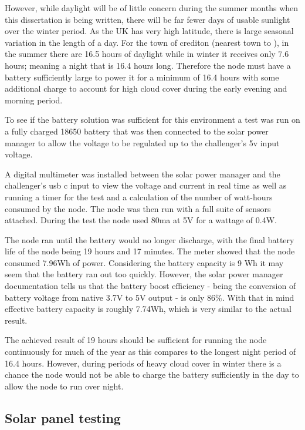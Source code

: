 However, while daylight will be of little concern during the summer months when
this dissertation is being written, there will be far fewer days of usable
sunlight over the winter period. As the UK has very high latitude, there is
large seasonal variation in the length of a day. For the town of crediton
(nearest town to \farmName), in the summer there are 16.5 hours of daylight
while in winter it receives only 7.6 hours; meaning a night that is 16.4 hours
long. Therefore the node must have a battery sufficiently large to power it for
a minimum of 16.4 hours with some additional charge to account for high cloud
cover during the early evening and morning period.

To see if the battery solution was sufficient for this environment a test
was run on a fully charged 18650 battery that was then connected to the solar
power manager to allow the voltage to be regulated up to the challenger's 5v
input voltage.

A digital multimeter was installed between the solar power manager and the
challenger's usb c input to view the voltage and current in real time as well as
running a timer for the test and a calculation of the number of watt-hours
consumed by the node. The node was then run with a full suite of sensors
attached. During the test the node used 80ma at 5V for a wattage of 0.4W.

The node ran until the battery would no longer discharge, with the final battery
life of the node being 19 hours and 17 minutes. The meter showed that the node
consumed 7.96Wh of power. Considering the battery capacity is 9 Wh it may seem
that the battery ran out too quickly. However, the solar power manager
documentation tells us that the battery boost efficiency - being the conversion
of battery voltage from native 3.7V to 5V output - is only 86\%. With that in
mind effective battery capacity is roughly 7.74Wh, which is very similar to the
actual result.

The achieved result of 19 hours should be sufficient for running the node
continuously for much of the year as this compares to the longest night period
of 16.4 hours. However, during periods of heavy cloud cover in winter there is a
chance the node would not be able to charge the battery sufficiently in the day
to allow the node to run over night.

\subsection{Solar panel testing}

